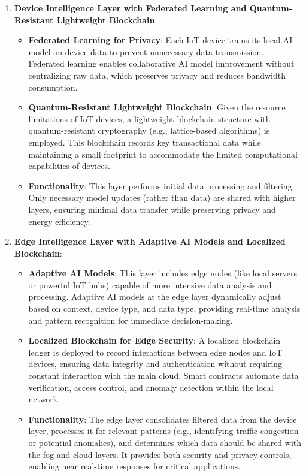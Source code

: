 \documentclass[12pt, oneside]{report}
\begin{document}
\begin{enumerate}
    \item \textbf{Device Intelligence Layer with Federated Learning and Quantum-Resistant Lightweight Blockchain}:
    \begin{itemize}
        \item \textbf{Federated Learning for Privacy}: Each IoT device trains its local AI model on-device data to prevent unnecessary data transmission. Federated learning enables collaborative AI model improvement without centralizing raw data, which preserves privacy and reduces bandwidth consumption.
        \item \textbf{Quantum-Resistant Lightweight Blockchain}: Given the resource limitations of IoT devices, a lightweight blockchain structure with quantum-resistant cryptography (e.g., lattice-based algorithms) is employed. This blockchain records key transactional data while maintaining a small footprint to accommodate the limited computational capabilities of devices.
        \item \textbf{Functionality}: This layer performs initial data processing and filtering. Only necessary model updates (rather than data) are shared with higher layers, ensuring minimal data transfer while preserving privacy and energy efficiency.
    \end{itemize}

    \item \textbf{Edge Intelligence Layer with Adaptive AI Models and Localized Blockchain}:
    \begin{itemize}
        \item \textbf{Adaptive AI Models}: This layer includes edge nodes (like local servers or powerful IoT hubs) capable of more intensive data analysis and processing. Adaptive AI models at the edge layer dynamically adjust based on context, device type, and data type, providing real-time analysis and pattern recognition for immediate decision-making.
        \item \textbf{Localized Blockchain for Edge Security}: A localized blockchain ledger is deployed to record interactions between edge nodes and IoT devices, ensuring data integrity and authentication without requiring constant interaction with the main cloud. Smart contracts automate data verification, access control, and anomaly detection within the local network.
        \item \textbf{Functionality}: The edge layer consolidates filtered data from the device layer, processes it for relevant patterns (e.g., identifying traffic congestion or potential anomalies), and determines which data should be shared with the fog and cloud layers. It provides both security and privacy controls, enabling near real-time responses for critical applications.
    \end{itemize}


\end{enumerate}
\end{document}
